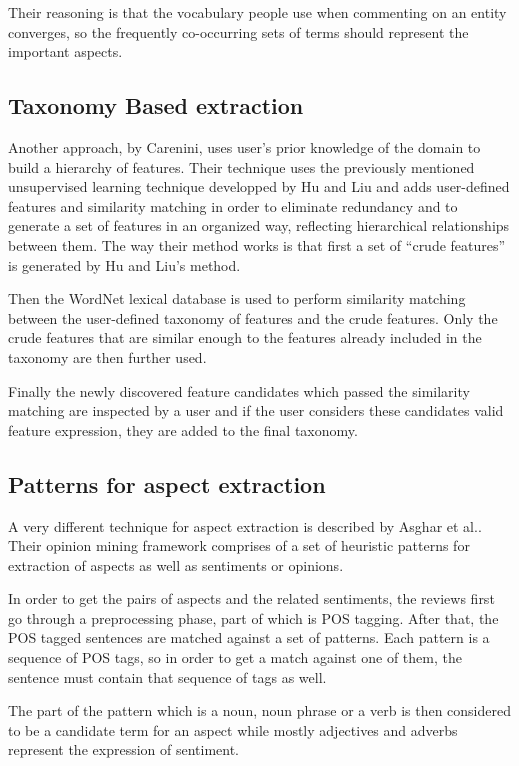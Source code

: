   Their reasoning is that the vocabulary people use when commenting on an entity converges, so the frequently co-occurring sets of terms should represent the important aspects.
\subsection{Taxonomy Based extraction}
\label{sec:taxonomy}
 Another approach, by Carenini\cite{carenini_2005}, uses user's prior knowledge of the domain to build a hierarchy of features. Their technique uses the previously mentioned unsupervised learning technique developped by Hu and Liu and adds user-defined features and similarity matching in order to eliminate redundancy  and to generate a set of features in an organized way, reflecting hierarchical relationships between them.
The way their method works is that first a set of ``crude features'' is generated by Hu and Liu's method.

Then  the WordNet lexical database is used to perform similarity matching between the user-defined taxonomy of features and the crude features. Only the crude features that are similar enough to the features already included in the taxonomy are then further used. 

Finally the newly discovered feature candidates which passed the similarity matching are inspected by a user and if the user considers these candidates valid feature expression, they are added to the final taxonomy.
\subsection{Patterns for aspect extraction}
A very different technique for aspect extraction is described by Asghar et al.\cite{asghar_2019}. Their opinion mining framework comprises of a set of heuristic patterns for extraction of aspects as well as sentiments or opinions. 

In order to get the pairs of aspects and the related sentiments, the reviews first go through a preprocessing phase, part of which is POS tagging. After that, the POS tagged sentences are matched against a set of patterns. Each pattern is a sequence of POS tags, so in order to get a match against one of them, the sentence must contain that sequence of tags as well. 

The part of the pattern which is a noun, noun phrase or a verb is then considered to be a candidate term for an aspect while mostly adjectives and adverbs represent the expression of sentiment.
